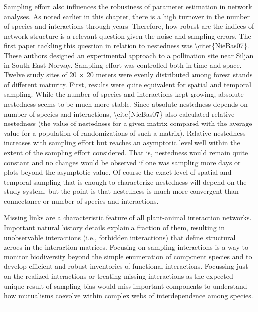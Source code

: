 \documentclass[a4paper,12pt]{article}
\begin{document}
\begin{spacing}{1.0}
Sampling effort also influences the robustness of parameter estimation in network analyses. As noted earlier in this chapter, there is a high turnover in the number of species and interactions through years. Therefore, how robust are the indices of network structure is a relevant question given the noise and sampling errors. The first paper tackling this question in relation to nestedness was \textbackslash{}citet\{NieBas07\}. These authors designed an experimental approach to a pollination site near Siljan in South-East Norway. Sampling effort was controlled both in time and space. Twelve study sites of 20 $\times$ 20 meters were evenly distributed among forest stands of different maturity. First, results were quite equivalent for spatial and temporal sampling. While the number of species and interactions kept growing, absolute nestedness seems to be much more stable. Since absolute nestedness depends on number of species and interactions, \textbackslash{}cite\{NieBas07\} also calculated relative nestedness (the value of nestedness for a given matrix compared with the average value for a population of randomizations of such a matrix). Relative nestedness increases with sampling effort but reaches an asymptotic level well within the extent of the sampling effort considered. That is, nestedness would remain quite constant and no changes would be observed if one was sampling more days or plots beyond the asymptotic value. Of course the exact level of spatial and temporal sampling that is enough to characterize nestedness will depend on the study system, but the point is that nestedness is much more convergent than connectance or number of species and interactions. 

Missing links are a characteristic feature of all plant-animal interaction networks. Important natural history details explain a fraction of them, resulting in unobservable interactions (i.e., forbidden interactions) that define structural zeroes in the interaction matrices. Focusing on sampling interactions is a way to monitor biodiversity beyond the simple enumeration of component species and to develop efficient and robust inventories of functional interactions. Focussing just on the realized interactions or treating missing interactions as the expected unique result of sampling bias would miss important components to understand how mutualisms coevolve within complex webs of interdependence among species. 

\begin{center}\rule{3in}{0.4pt}\end{center}



\end{spacing}
\end{document}

